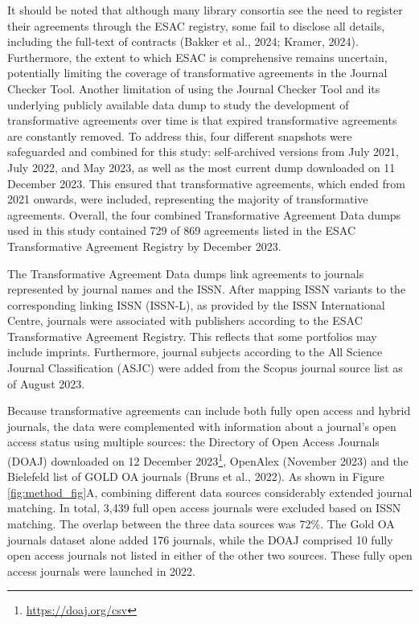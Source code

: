 \documentclass[a4paper,man,floatsintext,longtable,noextraspace,12pt]{apa6}
\begin{document}
It should be noted that although many library consortia see the need to
register their agreements through the ESAC registry, some fail to
disclose all details, including the full-text of contracts (Bakker et
al., 2024; Kramer, 2024). Furthermore, the extent to which ESAC is
comprehensive remains uncertain, potentially limiting the coverage of
transformative agreements in the Journal Checker Tool. Another
limitation of using the Journal Checker Tool and its underlying publicly
available data dump to study the development of transformative
agreements over time is that expired transformative agreements are
constantly removed. To address this, four different snapshots were
safeguarded and combined for this study: self-archived versions from
July 2021, July 2022, and May 2023, as well as the most current dump
downloaded on 11 December 2023. This ensured that transformative
agreements, which ended from 2021 onwards, were included, representing
the majority of transformative agreements. Overall, the four combined
Transformative Agreement Data dumps used in this study contained 729 of
869 agreements listed in the ESAC Transformative Agreement Registry by
December 2023.

The Transformative Agreement Data dumps link agreements to journals
represented by journal names and the ISSN. After mapping ISSN variants
to the corresponding linking ISSN (ISSN-L), as provided by the ISSN
International Centre, journals were associated with publishers according
to the ESAC Transformative Agreement Registry. This reflects that some
portfolios may include imprints. Furthermore, journal subjects according
to the All Science Journal Classification (ASJC) were added from the
Scopus journal source list as of August 2023.

Because transformative agreements can include both fully open access and
hybrid journals, the data were complemented with information about a
journal's open access status using multiple sources: the Directory of
Open Access Journals (DOAJ) downloaded on 12 December 2023\footnote{\url{https://doaj.org/csv}},
OpenAlex (November 2023) and the Bielefeld list of GOLD OA journals
(Bruns et al., 2022). As shown in Figure \ref{fig:method_fig}A,
combining different data sources considerably extended journal matching.
In total, 3,439 full open access journals were excluded based on ISSN
matching. The overlap between the three data sources was 72\%. The Gold
OA journals dataset alone added 176 journals, while the DOAJ comprised
10 fully open access journals not listed in either of the other two
sources. These fully open access journals were launched in 2022.
\end{document}
